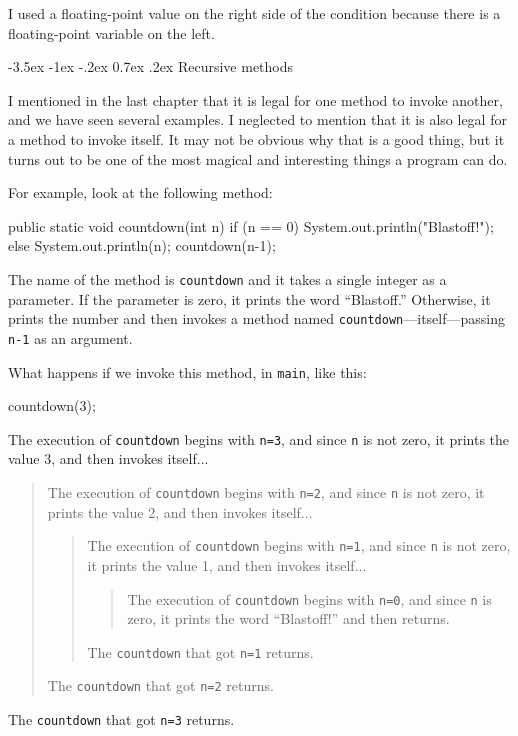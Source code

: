 \documentclass[12pt]{book}
\makeatletter
\renewcommand{\section}{\@startsection {section}{1}{\z@}%
    {-3.5ex \@plus -1ex \@minus -.2ex}%
    {0.7ex \@plus.2ex}%
    {\normalfont\Large\bfseries}}
\theoremstyle{exercise}
\makeatother
\begin{document}
I used a floating-point value on the right side of the condition because there is a floating-point variable on the left.


\section{Recursive methods}
\label{recursion}


I mentioned in the last chapter that it is legal for one method to invoke another, and we have seen several examples.
I neglected to mention that it is also legal for a method to invoke itself.
It may not be obvious why that is a good thing, but it turns out to be one of the most magical and interesting things a program can do.

For example, look at the following method:

\begin{code}
    public static void countdown(int n) {
        if (n == 0) {
            System.out.println("Blastoff!");
        } else {
            System.out.println(n);
            countdown(n-1);
        }
    }
\end{code}

The name of the method is {\tt countdown} and it takes a single integer as a parameter.
If the parameter is zero, it prints the word ``Blastoff.''
Otherwise, it prints the number and then invokes a method named {\tt countdown}---itself---passing {\tt n-1} as an argument.

What happens if we invoke this method, in {\tt main}, like this:

\begin{code}
    countdown(3);
\end{code}

The execution of {\tt countdown} begins with {\tt n=3}, and since {\tt n} is not zero, it prints the value 3, and then invokes itself...
\begin{quote}
The execution of {\tt countdown} begins with {\tt n=2}, and since {\tt n} is not zero, it prints the value 2, and then invokes itself...
\begin{quote}
The execution of {\tt countdown} begins with {\tt n=1}, and since {\tt n} is not zero, it prints the value 1, and then invokes itself...
\begin{quote}
The execution of {\tt countdown} begins with {\tt n=0}, and since {\tt n} is zero, it prints the word ``Blastoff!'' and then returns.
\end{quote}
The {\tt countdown} that got {\tt n=1} returns.
\end{quote}
The {\tt countdown} that got {\tt n=2} returns.
\end{quote}
The {\tt countdown} that got {\tt n=3} returns.
\end{document}

